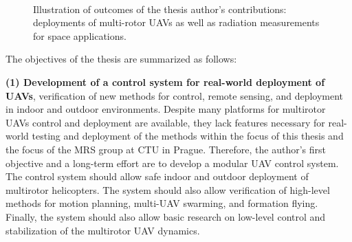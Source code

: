 \documentclass[a4paper,11pt,twoside,openright]{book}
\begin{document}
\begin{figure}[!hb]
{  }\\
  \vspace{-0.3em}
  \caption{Illustration of outcomes of the thesis author's contributions: deployments of multi-rotor \acp{UAV} as well as radiation measurements for space applications.}
  \label{fig:collage}
\end{figure}


The objectives of the thesis are summarized as follows:

\textbf{(1) Development of a control system for real-world deployment of \acp{UAV}}, verification of new methods for control, remote sensing, and deployment in indoor and outdoor environments.
Despite many platforms for multirotor \acp{UAV} control and deployment are available, they lack features necessary for real-world testing and deployment of the methods within the focus of this thesis and the focus of the \acl{MRS} group at \ac{CTU} in Prague.
Therefore, the author's first objective and a long-term effort are to develop a modular \ac{UAV} control system.
The control system should allow safe indoor and outdoor deployment of multirotor helicopters.
The system should also allow verification of high-level methods for motion planning, multi-\ac{UAV} swarming, and formation flying.
Finally, the system should also allow basic research on low-level control and stabilization of the multirotor \ac{UAV} dynamics.
\end{document}
